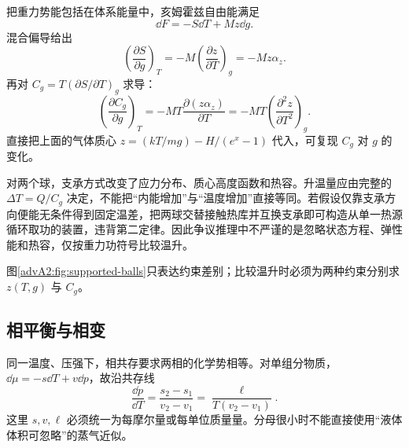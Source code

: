 {\begin{advsolution}
把重力势能包括在体系能量中，亥姆霍兹自由能满足
\[
 \dd F=-S\dd T+Mz\dd g.
\]
混合偏导给出
\[
 \left(\frac{\partial S}{\partial g}\right)_T
 =-M\left(\frac{\partial z}{\partial T}\right)_g=-Mz\alpha_z.
\]
再对 $C_g=T(\partial S/\partial T)_g$ 求导：
\[
 \boxed{\left(\frac{\partial C_g}{\partial g}\right)_T
 =-MT\frac{\partial(z\alpha_z)}{\partial T}
 =-MT\left(\frac{\partial^2z}{\partial T^2}\right)_g}.
\]
直接把上面的气体质心 $z=(kT/mg)-H/(e^x-1)$ 代入，可复现 $C_g$ 对 $g$ 的变化。

对两个球，支承方式改变了应力分布、质心高度函数和热容。升温量应由完整的
$\Delta T=Q/C_g$ 决定，不能把“内能增加”与“温度增加”直接等同。若假设仅靠支承方向便能无条件得到固定温差，把两球交替接触热库并互换支承即可构造从单一热源循环取功的装置，违背第二定律。因此争议推理中不严谨的是忽略状态方程、弹性能和热容，仅按重力功符号比较温升。

\begin{center}\begin{minipage}{\linewidth}\centering
{}
\label{advA2:fig:supported-balls}
\end{minipage}\end{center}
图\ref{advA2:fig:supported-balls}只表达约束差别；比较温升时必须为两种约束分别求 $z(T,g)$ 与 $C_g$。
\end{advsolution}

\subsection{相平衡与相变}

同一温度、压强下，相共存要求两相的化学势相等。对单组分物质，$\dd\mu=-s\dd T+v\dd p$，故沿共存线
\[
 \frac{\dd p}{\dd T}=\frac{s_2-s_1}{v_2-v_1}
 =\frac{\ell}{T(v_2-v_1)}.
\]
这里 $s,v,\ell$ 必须统一为每摩尔量或每单位质量量。分母很小时不能直接使用“液体体积可忽略”的蒸气近似。

}
